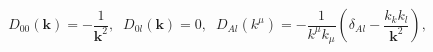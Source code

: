 \begin{equation}
D_{00}\left( \mathbf{k}\right) =-\frac{1}{\mathbf{k}^{2}},\;\;D_{0l}\left( 
\mathbf{k}\right) =0,\;\;D_{Al}\left( k^{\mu }\right) =-\frac{1}{k^{\mu
}k_{\mu }}\left( \delta _{Al}-\frac{k_{k}k_{l}}{\mathbf{k}^{2}}\right) ,
\end{equation}

